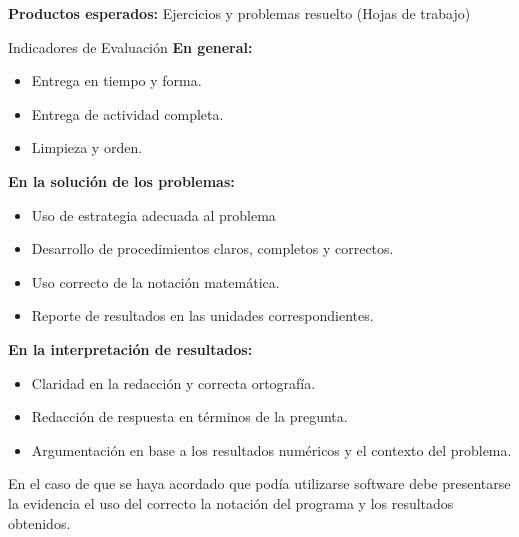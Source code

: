 \documentclass[11pt]{article}
\begin{document}
\begin{tcolorbox}
	\textbf{Productos esperados:}
	Ejercicios y problemas resuelto (Hojas de trabajo)
	
	\begin{mybox}{Indicadores de Evaluación}
		\textbf{En general:}
		\begin{itemize}
			\setlength{\itemsep}{0pt}
			\setlength{\parskip}{0pt}
			\item Entrega en tiempo y forma.
			\item Entrega de actividad completa.
			\item Limpieza y orden.
		\end{itemize}
		\textbf{En la solución de los problemas:}
		\begin{itemize}
			\setlength{\itemsep}{0pt}
			\setlength{\parskip}{0pt}
			\item Uso de estrategia adecuada al problema
			\item Desarrollo de procedimientos claros, completos y correctos.
			\item Uso correcto de la notación matemática.
			\item Reporte de resultados en las unidades correspondientes.
		\end{itemize}
		\textbf{En la interpretación de resultados:}
		\begin{itemize}
			\setlength{\itemsep}{0pt}
			\setlength{\parskip}{0pt}
			\item Claridad en la redacción y correcta ortografía.
			\item Redacción de respuesta en términos de la pregunta.
			\item Argumentación en base a los resultados numéricos y el contexto del problema.
		\end{itemize}
		
		En el caso de que se haya acordado que podía utilizarse software debe presentarse la evidencia el uso del correcto la notación del programa y los resultados obtenidos.
		
	\end{mybox}
\end{tcolorbox}
\end{document}

